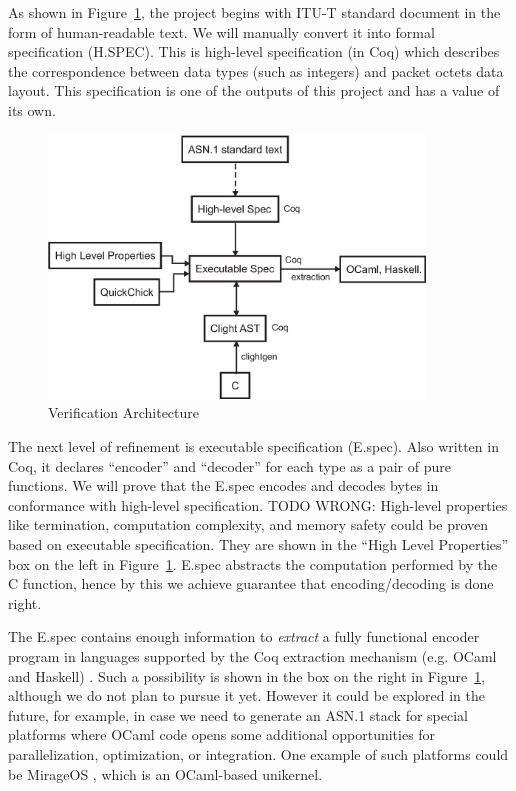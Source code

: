 \documentclass[acmsmall,nonacm]{acmart}
\begin{document}
As shown in Figure~\ref{fig:components}, the project begins with ITU-T
standard document in the form of human-readable text. We will manually
convert it into formal specification (H.SPEC). This is high-level
specification (in Coq) which describes the correspondence between data
types (such as integers) and packet octets data layout. This
specification is one of the outputs of this project and has a value of
its own.

\begin{figure}[h!]
  \centering
  \includegraphics[width=10cm]{VerificationArchitectureDiagram.eps}
  \caption{Verification Architecture}
  \label{fig:components}
\end{figure}

The next level of refinement is executable specification (E.spec). Also
written in Coq, it declares ``encoder'' and ``decoder'' for each type
as a pair of pure functions. We will prove that the E.spec encodes and decodes bytes in conformance with high-level
specification. TODO WRONG: High-level properties like termination, computation complexity, and memory safety could be proven based on executable specification. They are shown in the ``High Level Properties'' box on the left in Figure~\ref{fig:components}.
 E.spec abstracts the computation performed by the C function, hence by this we achieve guarantee that encoding/decoding is done right. 

The E.spec contains enough
information to \textit{extract} a fully functional encoder program in
languages supported by the Coq extraction mechanism (e.g. OCaml and
Haskell) \cite{Extraction}. Such a possibility is shown in the box
on the right in Figure~\ref{fig:components}, although we do not plan to
pursue it yet. However it could be explored in the future, for example,
in case we need to generate an ASN.1 stack for special platforms where
OCaml code opens some additional opportunities for parallelization,
optimization, or integration. One example of such platforms could be
MirageOS \cite{MirageOS}, which is an OCaml-based unikernel.
\end{document}
